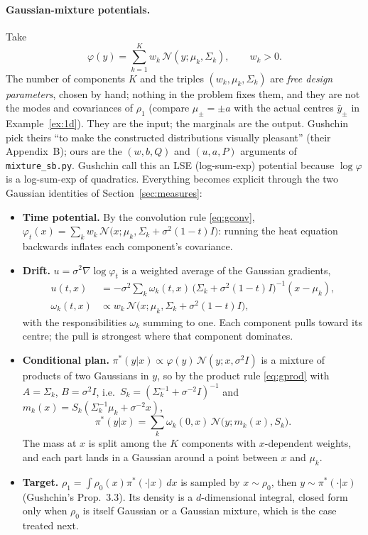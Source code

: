 \documentclass[11pt]{article}
\newcommand{\code}[1]{\texttt{#1}}
\newcommand{\Nc}{\mathcal{N}}
\theoremstyle{definition}
\theoremstyle{plain}
\begin{document}
\paragraph{Gaussian-mixture potentials.}
Take
\begin{equation}
  \label{eq:mixphi}
  \varphi(y)=\sum_{k=1}^K w_k\,\Nc(y;\mu_k,\Sigma_k),\qquad w_k>0 .
\end{equation}
The number of components $K$ and the triples $(w_k,\mu_k,\Sigma_k)$ are \emph{free design
parameters}, chosen by hand; nothing in the problem fixes them, and they are not the modes and
covariances of $\rho_1$ (compare $\mu_\pm=\pm a$ with the actual centres $\bar y_\pm$ in
Example~\ref{ex:1d}). They are the input; the marginals are the output. Gushchin pick theirs
``to make the constructed distributions visually pleasant'' (their Appendix~B); ours are the
$(w,b,Q)$ and $(u,a,P)$ arguments of \code{mixture\_sb.py}.
Gushchin call this an LSE (log-sum-exp) potential because $\log\varphi$ is a log-sum-exp of
quadratics. Everything becomes explicit through the two Gaussian identities of
Section~\ref{sec:measures}:
\begin{itemize}
  \item \textbf{Time potential.} By the convolution rule \eqref{eq:gconv},
        $\varphi_t(x)=\sum_kw_k\,\Nc\big(x;\mu_k,\Sigma_k+\sigma^2(1-t)I\big)$:
        running the heat equation backwards inflates each component's covariance.
  \item \textbf{Drift.} $u=\sigma^2\nabla\log\varphi_t$ is a weighted average of the Gaussian
        gradients,
        \begin{align*}
          u(t,x)&=-\sigma^2\sum_k\omega_k(t,x)\,\big(\Sigma_k+\sigma^2(1-t)I\big)^{-1}(x-\mu_k),\\
          \omega_k(t,x)&\propto w_k\,\Nc\big(x;\mu_k,\Sigma_k+\sigma^2(1-t)I\big),
        \end{align*}
        with the responsibilities $\omega_k$ summing to one. Each component pulls toward its
        centre; the pull is strongest where that component dominates.
  \item \textbf{Conditional plan.} $\pi^*(y|x)\propto\varphi(y)\,\Nc(y;x,\sigma^2I)$ is a
        mixture of products of two Gaussians in $y$, so by the product rule \eqref{eq:gprod}
        with $A=\Sigma_k$, $B=\sigma^2I$, i.e.\
        $S_k=(\Sigma_k^{-1}+\sigma^{-2}I)^{-1}$ and $m_k(x)=S_k(\Sigma_k^{-1}\mu_k+\sigma^{-2}x)$,
        \begin{equation}
          \label{eq:mixcond}
          \pi^*(y|x)=\sum_k\omega_k(0,x)\,\Nc\big(y;m_k(x),S_k\big).
        \end{equation}
        The mass at $x$ is split among the $K$ components with $x$-dependent weights, and
        each part lands in a Gaussian around a point between $x$ and $\mu_k$.
  \item \textbf{Target.} $\rho_1=\int\rho_0(x)\pi^*(\cdot|x)\,dx$ is sampled by
        $x\sim\rho_0$, then $y\sim\pi^*(\cdot|x)$ (Gushchin's Prop.\ 3.3). Its density is a
        $d$-dimensional integral, closed form only when $\rho_0$ is itself Gaussian or a
        Gaussian mixture, which is the case treated next.
\end{itemize}
\end{document}
